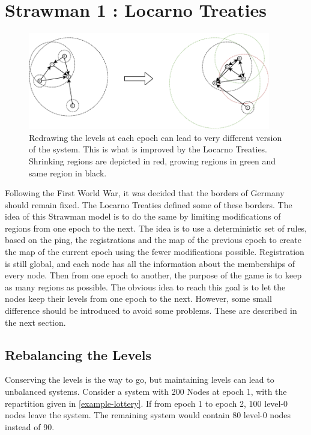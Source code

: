 \documentclass[a4paper,11pt,oneside]{report}
\begin{document}
\section{Strawman 1 : Locarno Treaties} \label{Locarno}

\begin{figure}[!h] 
\centering
\includegraphics[width=300pt]{figures/LocarnoTreaties-Redrawing}
\caption{Redrawing the levels at each epoch can lead to very different version
 of the system. This is what is improved by the Locarno Treaties. Shrinking
 regions are depicted in red, growing regions in green and same region in
 black.} \label{fig:LocarnoTreaties-Redrawing}
\end{figure}

Following the First World War, it was decided that the borders of Germany
should remain fixed. The Locarno Treaties defined some of these borders. The
idea of this Strawman model is to do the same by limiting modifications of
regions from one epoch to the next. The idea is to use a deterministic set of
rules, based on the ping, the registrations and the map of the previous epoch
to create the map of the current epoch using the fewer modifications possible.
Registration is still global, and each node has all the information about
the memberships of every node. Then from one epoch to another, the purpose of
the game is to keep as many regions as possible. The obvious idea to reach this
goal is to let the nodes keep their levels from one epoch to the next. However,
some small difference should be introduced to avoid some problems.
These are described in the next section.

\subsection{Rebalancing the Levels} \label{rebalancing}
Conserving the levels is the way to go, but maintaining levels can lead to
unbalanced systems. Consider a system with 200 Nodes at epoch 1, with the
repartition given in \autoref{example-lottery}. If from epoch 1 to epoch 2,
100 level-0 nodes leave the system. The remaining system would contain 80
level-0 nodes instead of 90. 
\end{document}
